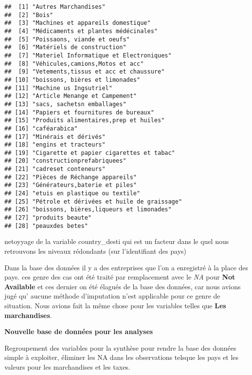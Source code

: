 \documentclass[
]{book}
\begin{document}
\begin{verbatim}
##  [1] "Autres Marchandises"                      
##  [2] "Bois"                                     
##  [3] "Machines et appareils domestique"         
##  [4] "Médicaments et plantes médécinales"       
##  [5] "Poissaons, viande et oeufs"               
##  [6] "Matériels de construction"                
##  [7] "Materiel Informatique et Electroniques"   
##  [8] "Véhicules,camions,Motos et acc"           
##  [9] "Vetements,tissus et acc et chaussure"     
## [10] "boissons, bières et limonades"            
## [11] "Machine us Ingsutriel"                    
## [12] "Article Menange et Campement"             
## [13] "sacs, sachetsn emballages"                
## [14] "Papiers et fournitures de bureaux"        
## [15] "Produits alimentaires,prep et huiles"     
## [16] "caféarabica"                              
## [17] "Minérais et dérivés"                      
## [18] "engins et tracteurs"                      
## [19] "Cigarette et papier cigarettes et tabac"  
## [20] "constructionprefabriquees"                
## [21] "cadreset conteneurs"                      
## [22] "Pièces de Réchange appareils"             
## [23] "Générateurs,baterie et piles"             
## [24] "etuis en plastique ou textile"            
## [25] "Pétrole et dérivées et huile de graissage"
## [26] "boissons, bières,liqueurs et limonades"   
## [27] "produits beaute"                          
## [28] "peauxdes betes"
\end{verbatim}

netoyyage de la variable country\_desti qui est un facteur dans le quel nous retrouvons les niveaux rédondants (sur l'identifiant des pays)

Dans la base des données il y a des entreprises que l'on a enregistré à la place des pays. ces genre des cas ont été traité par remplacement avec le \emph{NA} pour \textbf{Not Available} et ces dernier on été élagués de la base des données, car nous avions jugé qu' aucune méthode d'imputation n'est applicable pour ce genre de situation. Nous avions fait la même chose pour les variables telles que \textbf{Les marchandises}.

\textbf{Nouvelle base de données pour les analyses}

Regroupement des variables pour la synthèse pour rendre la base des données simple à exploiter, éliminer les NA dans les observations telsque les pays et les valeurs pour les marchandises et les taxes.
\end{document}
